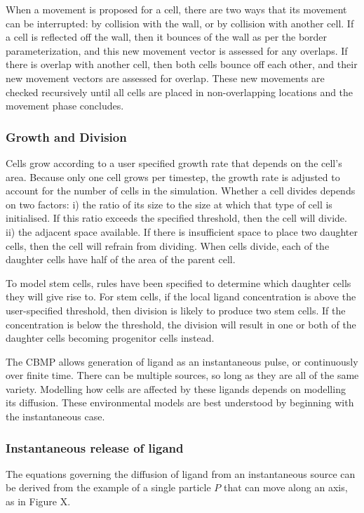 \documentclass[12pt]{article}
\begin{document}
When a movement is proposed for a cell, there are two ways that its 
movement can be interrupted: by collision with the wall, or by collision 
with another cell. If a cell is reflected off the wall, then it bounces 
of the wall as per the border parameterization, and this new movement 
vector is assessed for any overlaps. If there is overlap with another 
cell, then both cells bounce off each other, and their new movement 
vectors are assessed for overlap. These new movements are checked 
recursively until all cells are placed in non-overlapping locations and 
the movement phase concludes.

\subsubsection{Growth and Division}
Cells grow according to a user specified growth rate that depends on the 
cell's area. Because only one cell grows per timestep, the growth rate 
is adjusted to account for the number of cells in the simulation. 
Whether a cell divides depends on two factors: i) the ratio of its size 
to the size at which that type of cell is initialised. If this ratio 
exceeds the specified threshold, then the cell will divide. ii) the 
adjacent space available. If there is insufficient space to place two 
daughter cells, then the cell will refrain from dividing. When cells 
divide, each of the daughter cells have half of the area of the parent 
cell. 

To model stem cells, rules have been specified to determine which 
daughter cells they will give rise to. For stem cells, if the local 
ligand concentration is above the user-specified threshold, then 
division is likely to produce two stem cells. If the concentration is 
below the threshold, the division will result in one or both of the 
daughter cells becoming progenitor cells instead.

The CBMP allows generation of ligand as an instantaneous pulse, or 
continuously over finite time. There can be multiple sources, so long as 
they are all of the same variety. Modelling how cells are affected by 
these ligands depends on modelling its diffusion. These environmental 
models are best understood by beginning with the instantaneous case.

\subsubsection{Instantaneous release of ligand}
The equations governing the diffusion of ligand from an instantaneous 
source can be derived from the example of a single particle \(P\) that can 
move along an axis, as in Figure X.
\end{document}
